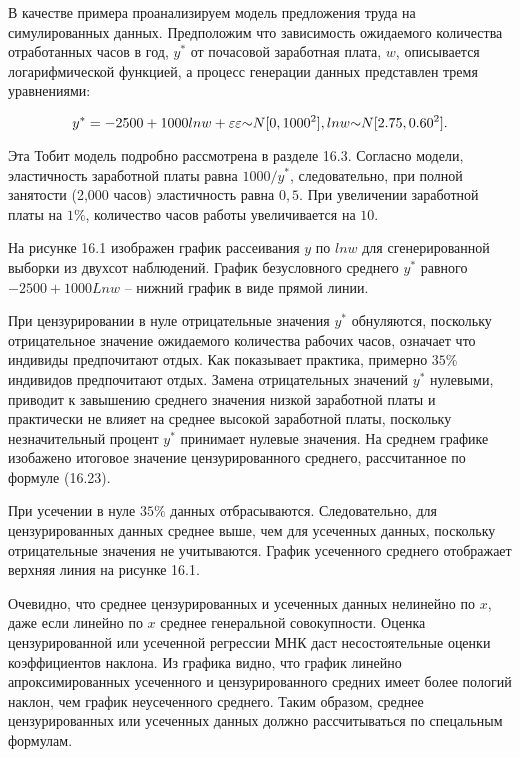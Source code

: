 В качестве примера проанализируем модель предложения труда на симулированных данных. Предположим что зависимость ожидаемого количества отработанных часов в год, $y^{*}$ от почасовой заработная плата, $w$, описывается логарифмической функцией, а процесс генерации данных представлен тремя уравнениями:

\begin{equation}
y^{*}=-2500+1000ln{w}+\varepsilon\\
\varepsilon{\sim}N[0,1000^2],\\
ln{w}{\sim}N[2.75,0.60^2].
\end{equation}


Эта Тобит модель подробно рассмотрена в разделе 16.3. Согласно модели, эластичность заработной платы равна $1000/y^{*}$, следовательно, при полной занятости (2,000 часов) эластичность равна $0,5$. При увеличении заработной платы на $1\%$, количество часов работы увеличивается на $10$.

На рисунке 16.1 изображен график рассеивания $y$ по $ln{w}$ для сгенерированной выборки из двухсот наблюдений. График безусловного среднего $y^{*}$ равного $-2500+1000 Ln{w}$ -- нижний график в виде прямой линии.

При цензурировании в нуле отрицательные значения $y^{*}$ обнуляются, поскольку отрицательное значение ожидаемого количества рабочих часов, означает что индивиды предпочитают отдых. Как показывает практика, примерно $35\%$ индивидов предпочитают отдых. Замена отрицательных значений $y^{*}$ нулевыми, приводит к завышению среднего значения низкой заработной платы и практически не влияет на среднее высокой заработной платы, поскольку незначительный процент $y^{*}$ принимает нулевые значения. На среднем графике изобажено итоговое значение цензурированного среднего, рассчитанное по формуле (16.23).


При усечении в нуле $35\%$ данных отбрасываются. Следовательно, для цензурированных данных среднее выше, чем для усеченных данных, поскольку отрицательные значения не учитываются. График усеченного среднего отображает верхняя линия на рисунке 16.1.

Очевидно, что среднее цензурированных и усеченных данных нелинейно по $x$, даже если линейно по $x$ среднее генеральной совокупности. Оценка цензурированной или усеченной регрессии МНК даст несостоятельные оценки коэффициентов наклона. Из графика видно, что график линейно апроксимированных усеченного и цензурированного средних имеет более пологий наклон, чем график неусеченного среднего. Таким образом, среднее цензурированных или усеченных данных должно рассчитываться по спецальным формулам. 

